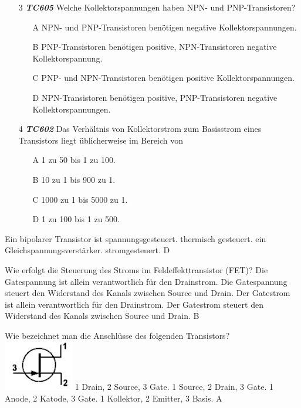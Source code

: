 \begin{enumerate} 
\itemsep1pt\parskip0pt
\item[3] \emph{\textbf{TC605}} Welche Kollektorspannungen haben NPN- und PNP-Transistoren?
	\begin{enumerate}
	\itemsep1pt\parskip0pt
		\item[A] NPN- und PNP-Transistoren benötigen negative Kollektorspannungen.
		\item[B] PNP-Transistoren benötigen positive, NPN-Transistoren negative Kollektorspannung.
		\item[C] PNP- und NPN-Transistoren benötigen positive Kollektorspannungen.
		\item[D] NPN-Transistoren benötigen positive, PNP-Transistoren negative Kollektorspannungen.
	\end{enumerate}
\end{enumerate}

\begin{enumerate} 
\item[4] \emph{\textbf{TC602}}  Das Verhältnis von Kollektorstrom zum Basisstrom eines Transistors liegt üblicherweise im Bereich von
	\begin{enumerate}
	\itemsep1pt\parskip0pt
		\item[A] 1 zu 50 bis 1 zu 100.
		\item[B] 10 zu 1 bis 900 zu 1.
		\item[C] 1000 zu 1 bis 5000 zu 1.
		\item[D] 1 zu 100 bis 1 zu 500.
	\end{enumerate}
\end{enumerate}

{Ein bipolarer Transistor ist}%
{spannungsgesteuert.}%
{thermisch gesteuert.}%
{ein Gleichspannungsverstärker.}%
{stromgesteuert.}%
{D}%

{Wie erfolgt die Steuerung des Stroms im Feldeffekttransistor (FET)?}%
{Die Gatespannung ist allein verantwortlich für den Drainstrom.}%
{Die Gatespannung steuert den Widerstand des Kanals zwischen Source und Drain.}%
{Der Gatestrom ist allein verantwortlich für den Drainstrom.}%
{Der Gatestrom steuert den Widerstand des Kanals zwischen Source und Drain.}%
{B}%

{Wie bezeichnet man die Anschlüsse des folgenden Transistors?\\ \includegraphics[scale=0.5]{Transistor/Bilder/TC612.png}}%
{1 Drain, 2 Source, 3 Gate.}%
{1 Source, 2 Drain, 3 Gate.}%
{1 Anode,  2 Katode, 3 Gate.}%
{1 Kollektor, 2 Emitter, 3 Basis.}%
{A}%

